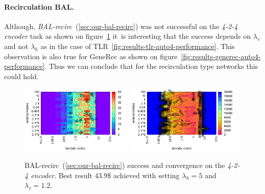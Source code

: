 \paragraph{Recirculation BAL.} 

Although, \emph{BAL-recirc}~(\ref{sec:our-bal-recirc}) was not successful on the \emph{4-2-4 encoder} task as shown on figure~\ref{fig:results-bal-recirc-auto4-performance} it~is interesting that the success depends on $\lambda_v$ and not $\lambda_h$ as in the case of TLR~\ref{fig:results-tlr-auto4-performance}. This observation is also true for GeneRec as shown on figure~\ref{fig:results-generec-auto4-performance}. Thus we can conclude that for the recirculation type networks this could hold. 
\begin{figure}[H]
  \centering
  \includegraphics[width=0.48\textwidth]{img/bal-recirc-auto4-success.pdf}   
  \includegraphics[width=0.48\textwidth]{img/bal-recirc-auto4-epoch.pdf}     
  \caption{BAL-recirc~(\ref{sec:our-bal-recirc}) success and convergence on the \emph{4-2-4 encoder}. Best result $43.9\$$ achieved with setting $\lambda_h=5$ and $\lambda_v=1.2$.}
  \label{fig:results-bal-recirc-auto4-performance}
\end{figure}


